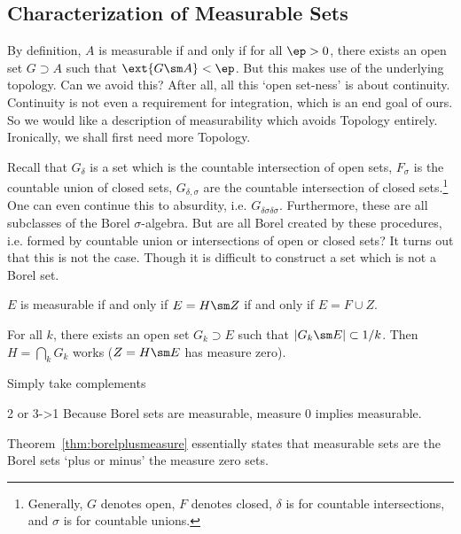  \subsection{Characterization of Measurable Sets}
 
 By definition, $A$ is measurable if and only if for all $\ep>0$, there exists an open set $G \supset A$ such that $\ext{G \sm A}<\ep$. But this makes use of the underlying topology. Can we avoid this? After all, all this `open set-ness' is about continuity. Continuity is not even a requirement for integration, which is an end goal of ours. So we would like a description of measurability which avoids Topology entirely. Ironically, we shall first need more Topology.
 
 Recall that $G_\delta$ is a set which is the countable intersection of open sets, $F_\sigma$ is the countable union of closed sets, $G_{\delta,\sigma}$ are the countable intersection of closed sets.\footnote{Generally, $G$ denotes open, $F$ denotes closed, $\delta$ is for countable intersections, and $\sigma$ is for countable unions.} One can even continue this to absurdity, i.e. $G_{\delta\sigma\delta\sigma}$. Furthermore, these are all subclasses of the Borel $\sigma$-algebra. But are all Borel created by these procedures, i.e. formed by countable union or intersections of open or closed sets? It turns out that this is not the case. Though it is difficult to construct a set which is not a Borel set. 
 
 \begin{thm} \label{thm:borelplusmeasure}
 $E$ is measurable if and only if $E= H \sm Z$ if and only if $E= F \cup Z$. 
 \end{thm}

\pf For all $k$, there exists an open set $G_k \supset E$ such that $|G_k\sm E| \subset 1/k$. Then $H= \bigcap_k G_k$ works ($Z=H \sm E$ has measure zero). 



Simply take complements

2 or 3->1 Because Borel sets are measurable, measure 0 implies measurable. 




Theorem~\ref{thm:borelplusmeasure} essentially states that measurable sets are the Borel sets `plus or minus' the measure zero sets. 


